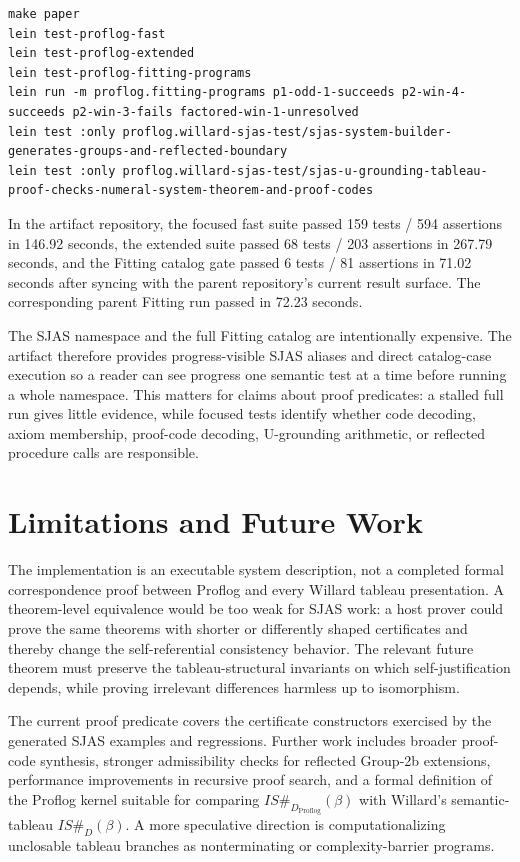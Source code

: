 \documentclass[runningheads]{llncs}
\begin{document}
\begin{lstlisting}
make paper
lein test-proflog-fast
lein test-proflog-extended
lein test-proflog-fitting-programs
lein run -m proflog.fitting-programs p1-odd-1-succeeds p2-win-4-succeeds p2-win-3-fails factored-win-1-unresolved
lein test :only proflog.willard-sjas-test/sjas-system-builder-generates-groups-and-reflected-boundary
lein test :only proflog.willard-sjas-test/sjas-u-grounding-tableau-proof-checks-numeral-system-theorem-and-proof-codes
\end{lstlisting}

In the artifact repository, the focused fast suite passed 159 tests / 594
assertions in 146.92 seconds, the extended suite passed 68 tests / 203
assertions in 267.79 seconds, and the Fitting catalog gate passed 6 tests / 81
assertions in 71.02 seconds after syncing with the parent repository's current
result surface.  The corresponding parent Fitting run passed in 72.23 seconds.

The SJAS namespace and the full Fitting catalog are intentionally expensive.
The artifact therefore provides progress-visible SJAS aliases and direct
catalog-case execution so a reader can see progress one semantic test at a time
before running a whole namespace.  This matters for claims about proof
predicates: a stalled full run gives little evidence, while focused tests
identify whether code decoding, axiom membership, proof-code decoding,
U-grounding arithmetic, or reflected procedure calls are responsible.

\section{Limitations and Future Work}

The implementation is an executable system description, not a completed
formal correspondence proof between Proflog and every Willard tableau
presentation.  A theorem-level equivalence would be too weak for SJAS work: a
host prover could prove the same theorems with shorter or differently shaped
certificates and thereby change the self-referential consistency behavior.  The
relevant future theorem must preserve the tableau-structural invariants on
which self-justification depends, while proving irrelevant differences harmless
up to isomorphism.

The current proof predicate covers the certificate constructors exercised by
the generated SJAS examples and regressions.  Further work includes broader
proof-code synthesis, stronger admissibility checks for reflected Group-2b
extensions, performance improvements in recursive proof search, and a formal
definition of the Proflog kernel suitable for comparing
\(IS\#_{D_{\mathrm{Proflog}}}(\beta)\) with Willard's semantic-tableau
\(IS\#_D(\beta)\).  A more speculative direction is computationalizing
unclosable tableau branches as nonterminating or complexity-barrier programs.
\end{document}
